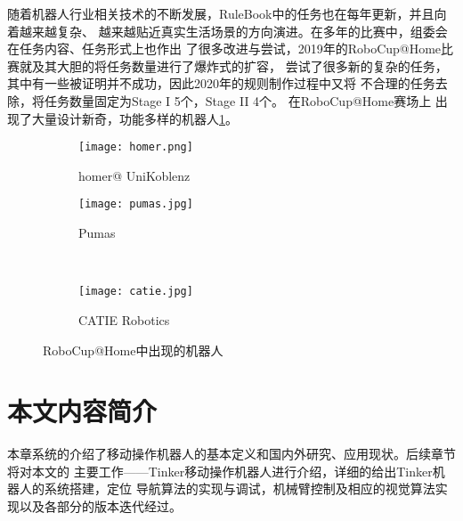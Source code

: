 随着机器人行业相关技术的不断发展，RuleBook中的任务也在每年更新，并且向着越来越复杂、
越来越贴近真实生活场景的方向演进。在多年的比赛中，组委会在任务内容、任务形式上也作出
了很多改进与尝试，2019年的RoboCup@Home比赛就及其大胆的将任务数量进行了爆炸式的扩容，
尝试了很多新的复杂的任务，其中有一些被证明并不成功，因此2020年的规则制作过程中又将
不合理的任务去除，将任务数量固定为Stage I 5个，Stage II 4个。 在RoboCup@Home赛场上
出现了大量设计新奇，功能多样的机器人\ref{fig:other_teams}。

\begin{figure}
    \centering
    \begin{minipage}{.45\linewidth}
            \begin{subfigure}[t]{.9\linewidth}
                \texttt{[image: homer.png]}
                \caption{homer@ UniKoblenz}
            \end{subfigure}
    \end{minipage}
    \begin{minipage}{.45\linewidth}
        \begin{subfigure}[t]{.8\linewidth}
            \texttt{[image: pumas.jpg]}
            \caption{Pumas}
        \end{subfigure} \\
        \begin{subfigure}[b]{.8\linewidth}
            \texttt{[image: catie.jpg]}
            \caption{CATIE Robotics}
        \end{subfigure} 
    \end{minipage}
    \caption{RoboCup@Home中出现的机器人}
    \label{fig:other_teams}
\end{figure}

\section{本文内容简介}

本章系统的介绍了移动操作机器人的基本定义和国内外研究、应用现状。后续章节将对本文的
主要工作——Tinker移动操作机器人进行介绍，详细的给出Tinker机器人的系统搭建，定位
导航算法的实现与调试，机械臂控制及相应的视觉算法实现以及各部分的版本迭代经过。





